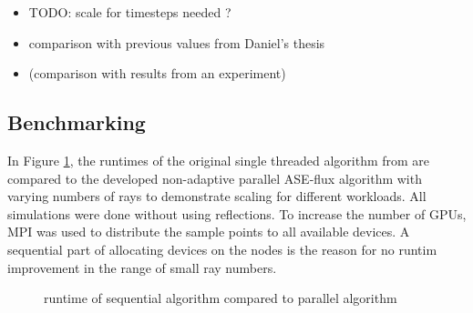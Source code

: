 \begin{itemize}
  \item TODO: scale for timesteps needed ?

  \item comparison with previous values from Daniel's thesis

  \item (comparison with results from an experiment)

\end{itemize}


\subsection{Benchmarking}
\label{subsec:benchmarking}
In Figure \ref{plot:runtime}, the runtimes of the original single threaded
algorithm from \cite{ASE2010} are compared to the developed non-adaptive
parallel ASE-flux algorithm with varying numbers of rays to demonstrate
scaling for different workloads. All simulations were done without using
reflections. To increase the number of GPUs, MPI\cite{MPI} was used to distribute the
sample points to all available devices. A sequential part of allocating
devices on the nodes is the reason for no runtim improvement in the range
of small ray numbers.

\begin{figure}[H]
  \centerline{
    }
  \caption{runtime of sequential algorithm compared to parallel algorithm}
  \label{plot:runtime}
\end{figure}


